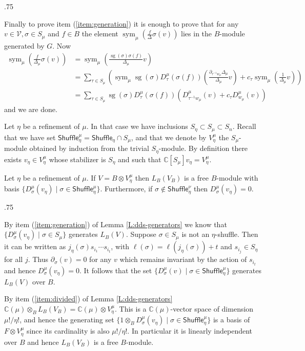 \documentclass[11pt,fleqn]{article}
\makeatletter
\newcounter{para}[section]
\renewenvironment{proof}[1][\textit{Proof}]{\par
  \pushQED{\qed}%
  \normalfont \topsep.75\paraskip\relax
  \trivlist
  \item[\hskip\labelsep
        \itshape
    #1\@addpunct{.}]\ignorespaces
}{%
  \popQED\endtrivlist\@endpefalse
}
\newcommand\CC{\mathbb C}
\newcommand\ot{\otimes}
\newcommand\Shuffle{\mathsf{Shuffle}}
\DeclareMathOperator\sym{sym}
\DeclareMathOperator\sg{sg}
\makeatother
\begin{document}
\begin{proof}
Finally to prove item (\ref{item:generation}) it is enough to prove that for 
any $v \in \mathcal V, \sigma \in S_\mu$ and $f \in B$ the element $\sym_\mu
\left( \frac{f}{\Delta} \sigma (v)\right)$ lies in the $B$-module generated 
by $G$. Now
\begin{align*}
\sym_\mu \left(
  \frac{f}{\Delta_\mu} \sigma(v)
\right)
&= \sym_\mu \left(
  \frac{\sg(\sigma)\sigma(f)}{\Delta_\mu} v
\right)
\\
&=\sum_{\tau \in S_\mu}\left(
    \sym_\mu \sg(\sigma)D_\tau^\mu(\sigma(f)) \left(
      \frac{\partial_{\tau^{-1} w_\mu} \Delta_\mu}{\Delta_\mu} v
      \right)
    + c_\tau \sym_\mu \left( \frac{1}{\Delta_\mu} v\right)
    \right)  \\
&= \sum_{\tau \in S_\mu}\sg(\sigma)D_\tau^\mu(\sigma(f))\left(
    D^\mu_{\tau^{-1} w_\mu}(v)
    + c_\tau D^\mu_{w_\mu}(v)
    \right)
\end{align*}
and we are done.
\end{proof}

Let $\eta$ be a refinement of $\mu$. In that case we have inclusions $S_\eta 
\subset S_\mu \subset S_n$. Recall that we have set $\Shuffle_\eta^\mu = 
\Shuffle_\eta \cap S_\mu$, and that we denote by $V^\mu_\eta$ the 
$S_\mu$-module obtained by induction from the trivial $S_\eta$-module. By 
definition there exists $v_\eta \in V^\mu_\eta$ whose stabilizer is $S_\eta$ 
and such that $\CC[S_\mu]v_\eta = V^\mu_\eta$.

\begin{Lemma}
\label{L:dds-basis}
Let $\eta$ be a refinement of $\mu$. If $V = B \ot V^\mu_\eta$ then 
$L_B(V_B)$ is a free $B$-module with basis $\{D^\mu_\sigma(v_\eta) \mid \sigma 
\in \Shuffle_\eta^\mu\}$. Furthermore, if $\sigma \notin \Shuffle_\eta^\nu$ 
then $D^\mu_\sigma (v_\eta) = 0$.
\end{Lemma}
\begin{proof}
By item (\ref{item:generation}) of Lemma \ref{L:dds-generators} we know that
$\{D_\sigma^\mu(v_\eta) \mid \sigma \in S_\mu\}$ generates $L_B(V)$.
Suppose $\sigma \in S_\mu$ is not an $\eta$-shuffle. Then it can be 
written as $j_\eta(\sigma) s_{i_1} \cdots s_{i_t}$, with $\ell(\sigma) = 
\ell(j_\eta(\sigma)) + t$ and $s_{i_j} \in S_\eta$ for all $j$. Thus 
$\partial_{\sigma}(v) = 0$ for any $v$ which remains invariant by the action 
of $s_{i_t}$ and hence $D^\mu_{\sigma}(v_\eta) = 0$. It follows that
the set $\{D_\sigma^\mu(v) \mid \sigma \in \Shuffle^\mu_\eta\}$ generates 
$L_B(V)$ over $B$. 

By item (\ref{item:divided}) of Lemma \ref{L:dds-generators} $\CC(\mu) \ot_B  
L_B(V_B) = \CC(\mu) \ot V^\mu_\eta$. This is a $\CC(\mu)$-vector space of 
dimension $\mu!/\eta!$, and hence the generating set $\{1 \ot_B 
D_\sigma^\mu(v_\eta) \mid \sigma \in \Shuffle_\eta^\mu\}$ is a basis of $F \ot 
V^\mu_\eta$ since its cardinality is also $\mu!/\eta!$. In particular it is 
linearly independent over $B$ and hence $L_B(V_B)$ is a free $B$-module.
\end{proof}
\end{document}
